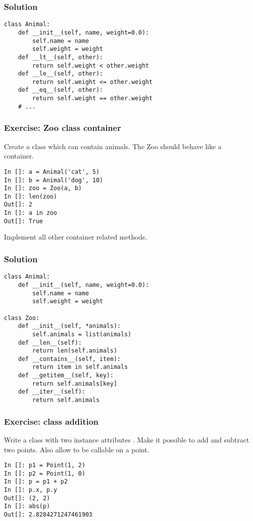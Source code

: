 \documentclass[14pt,compress,aspectratio=169]{beamer}
\begin{document}
\begin{frame}
  \frametitle{Solution}
  \small
\begin{lstlisting}
class Animal:
    def __init__(self, name, weight=0.0):
        self.name = name
        self.weight = weight
    def __lt__(self, other):
        return self.weight < other.weight
    def __le__(self, other):
        return self.weight <= other.weight
    def __eq__(self, other):
        return self.weight == other.weight
    # ...
\end{lstlisting}
\end{frame}

\begin{frame}
  \frametitle{Exercise: Zoo class container}
  \begin{block}{}
    Create a  class which can contain animals.  The Zoo should behave
    like a container.
  \end{block}

\begin{lstlisting}
In []: a = Animal('cat', 5)
In []: b = Animal('dog', 10)
In []: zoo = Zoo(a, b)
In []: len(zoo)
Out[]: 2
In []: a in zoo
Out[]: True
\end{lstlisting}
  Implement all other container related methods.
\end{frame}


\begin{frame}
  \frametitle{Solution}
  \vspace*{-0.1in}
  \small
\begin{lstlisting}
class Animal:
    def __init__(self, name, weight=0.0):
        self.name = name
        self.weight = weight

class Zoo:
    def __init__(self, *animals):
        self.animals = list(animals)
    def __len__(self):
        return len(self.animals)
    def __contains__(self, item):
        return item in self.animals
    def __getitem__(self, key):
        return self.animals[key]
    def __iter__(self):
        return self.animals
\end{lstlisting}
\end{frame}



\begin{frame}
  \frametitle{Exercise:  class addition}
  \begin{block}{}
    Write a  class with two instance attributes .  Make it
    possible to add and subtract two points.  Also allow  to be
    callable on a point.
  \end{block}

\begin{lstlisting}
In []: p1 = Point(1, 2)
In []: p2 = Point(1, 0)
In []: p = p1 + p2
In []: p.x, p.y
Out[]: (2, 2)
In []: abs(p)
Out[]: 2.8284271247461903
\end{lstlisting}
\end{frame}
\end{document}
